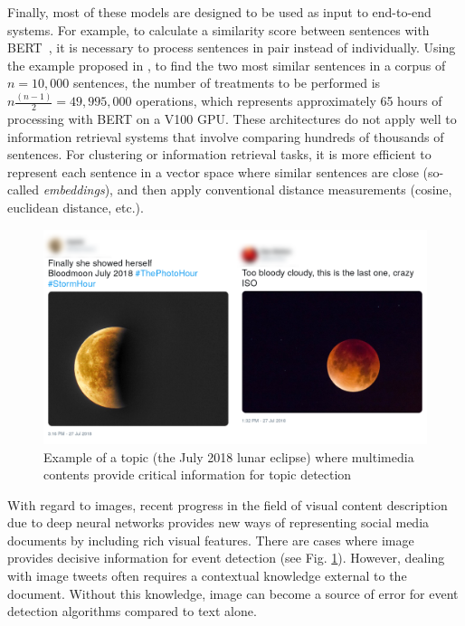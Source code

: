 Finally, most of these models are designed to be used as input to
end-to-end systems. For example, to calculate a similarity score between sentences
with BERT~\citep{devlin2018bert}, it is necessary to process sentences in pair instead of individually. Using the example proposed in \citep{reimers_2019_sentence}, to find the two most similar sentences in a corpus of $n = 10,000$ sentences, the number of treatments to be performed is $n\frac{(n - 1)}{2} = 49,995,000$ operations, which represents approximately 65 hours of processing with BERT on a V100 GPU.
These architectures do not apply well to information retrieval systems that involve comparing
hundreds of thousands of sentences. For clustering or information retrieval tasks, 
it is more efficient to represent each sentence in a vector space where similar sentences
 are close (so-called \textit{embeddings}), and then apply conventional distance measurements 
 (cosine, euclidean distance, etc.).
 
 \begin{figure}
  \includegraphics[width=\textwidth]{figures/Moon_horizontal.png}
    \caption{Example of a topic (the July 2018 lunar eclipse) where multimedia contents provide critical information for topic detection}
    \label{fig:moon}
\end{figure}
 
 With regard to images, recent progress in the field of visual content description due to deep neural networks provides new ways of representing social media documents by including rich visual features. There are cases where image provides decisive information for event detection (see Fig. \ref{fig:moon}). However, dealing with image tweets often requires a contextual knowledge external to the document. Without this knowledge, image can become a source of error for event detection algorithms compared to text alone.
 
